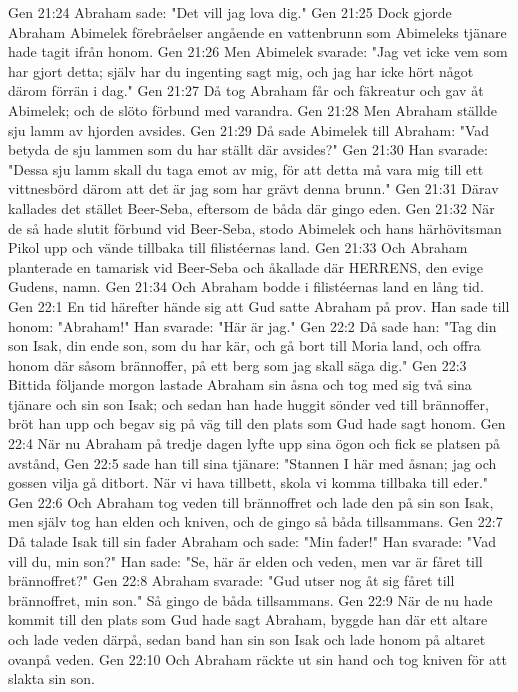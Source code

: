 Gen 21:24  Abraham sade: "Det vill jag lova dig."
Gen 21:25  Dock gjorde Abraham Abimelek förebråelser angående en vattenbrunn som Abimeleks tjänare hade tagit ifrån honom.
Gen 21:26  Men Abimelek svarade: "Jag vet icke vem som har gjort detta; själv har du ingenting sagt mig, och jag har icke hört något därom förrän i dag."
Gen 21:27  Då tog Abraham får och fäkreatur och gav åt Abimelek; och de slöto förbund med varandra.
Gen 21:28  Men Abraham ställde sju lamm av hjorden avsides.
Gen 21:29  Då sade Abimelek till Abraham: "Vad betyda de sju lammen som du har ställt där avsides?"
Gen 21:30  Han svarade: "Dessa sju lamm skall du taga emot av mig, för att detta må vara mig till ett vittnesbörd därom att det är jag som har grävt denna brunn."
Gen 21:31  Därav kallades det stället Beer-Seba, eftersom de båda där gingo eden.
Gen 21:32  När de så hade slutit förbund vid Beer-Seba, stodo Abimelek och hans härhövitsman Pikol upp och vände tillbaka till filistéernas land.
Gen 21:33  Och Abraham planterade en tamarisk vid Beer-Seba och åkallade där HERRENS, den evige Gudens, namn.
Gen 21:34  Och Abraham bodde i filistéernas land en lång tid.
Gen 22:1  En tid härefter hände sig att Gud satte Abraham på prov. Han sade till honom: "Abraham!" Han svarade: "Här är jag."
Gen 22:2  Då sade han: "Tag din son Isak, din ende son, som du har kär, och gå bort till Moria land, och offra honom där såsom brännoffer, på ett berg som jag skall säga dig."
Gen 22:3  Bittida följande morgon lastade Abraham sin åsna och tog med sig två sina tjänare och sin son Isak; och sedan han hade huggit sönder ved till brännoffer, bröt han upp och begav sig på väg till den plats som Gud hade sagt honom.
Gen 22:4  När nu Abraham på tredje dagen lyfte upp sina ögon och fick se platsen på avstånd,
Gen 22:5  sade han till sina tjänare: "Stannen I här med åsnan; jag och gossen vilja gå ditbort. När vi hava tillbett, skola vi komma tillbaka till eder."
Gen 22:6  Och Abraham tog veden till brännoffret och lade den på sin son Isak, men själv tog han elden och kniven, och de gingo så båda tillsammans.
Gen 22:7  Då talade Isak till sin fader Abraham och sade: "Min fader!" Han svarade: "Vad vill du, min son?" Han sade: "Se, här är elden och veden, men var är fåret till brännoffret?"
Gen 22:8  Abraham svarade: "Gud utser nog åt sig fåret till brännoffret, min son." Så gingo de båda tillsammans.
Gen 22:9  När de nu hade kommit till den plats som Gud hade sagt Abraham, byggde han där ett altare och lade veden därpå, sedan band han sin son Isak och lade honom på altaret ovanpå veden.
Gen 22:10  Och Abraham räckte ut sin hand och tog kniven för att slakta sin son.

